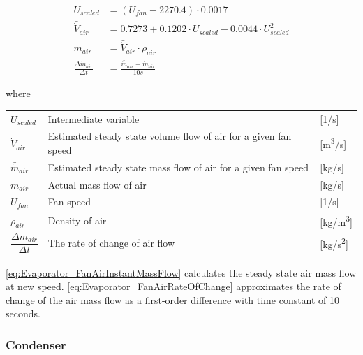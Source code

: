 \begin{align}
	U_{scaled} & = (U_{fan} - 2270.4)\cdot 0.0017 \\
	\bar{\dot{V}}_{air} & = 0.7273 + 0.1202 \cdot U_{scaled}  -0.0044 \cdot U_{scaled}^2\\
	\bar{\dot{m}}_{air} & = \bar{\dot{V}}_{air} \cdot \rho_{air}  \label{eq:Evaporator_FanAirInstantMassFlow}\\
	\frac{\Delta \dot{m}_{air}}{\Delta t} & = \frac{\bar{\dot{m}}_{air}  - \dot{m}_{air}} {10s} \label{eq:Evaporator_FanAirRateOfChange}
\end{align}

where

\begin{center}
	\begin{tabular}{l p{8cm} l}
		$ U_{scaled} $ 								& Intermediate variable												& [1/\si{s}]\\
		$\bar{\dot{V}}_{air}$						& Estimated steady state volume flow of air for a given fan speed 	& [\si{m^3}/\si{s}] \\
		$\bar{\dot{m}}_{air}$						& Estimated steady state mass flow of air for a given fan speed 	& [\si{kg}/\si{s}] \\
		$\dot{m}_{air}$								& Actual mass flow of air					  						& [\si{kg}/\si{s}] \\            
		$U_{fan}$									& Fan speed 														& [1/\si{s}] \\                                   
		$\rho_{air}$								& Density of air													& [\si{kg}/\si{m^3}] \\[0.2cm]               
		$\dfrac{\Delta \dot{m}_{air}}{\Delta t} $ 	& The rate of change of	air flow 									& [\si{kg}/\si{s^2}]
	\end{tabular}                                                                                  
\end{center}

\cref{eq:Evaporator_FanAirInstantMassFlow} calculates the steady state air mass flow at new speed. \cref{eq:Evaporator_FanAirRateOfChange} approximates the rate of change of the air mass flow as a first-order difference with time constant of 10 seconds. \\



\subsubsection{Condenser}

